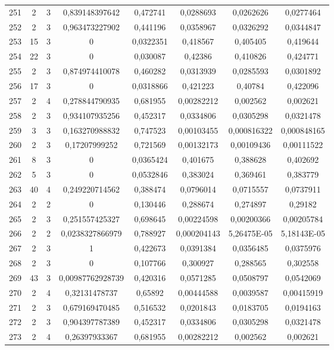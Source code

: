 \begin{longtable}{|c|c|c|c|c|c|c|c|}
251 & 2 & 3 & 0,839148397642 & 0,472741 & 0,0288693 & 0,0262626 & 0,0277464  \\
252 & 2 & 3 & 0,963473227902 & 0,441196 & 0,0358967 & 0,0326292 & 0,0344847  \\
253 & 15 & 3 & 0 & 0,0322351 & 0,418567 & 0,405405 & 0,419644  \\
254 & 22 & 3 & 0 & 0,030087 & 0,42386 & 0,410826 & 0,424771  \\
255 & 2 & 3 & 0,874974410078 & 0,460282 & 0,0313939 & 0,0285593 & 0,0301892  \\
256 & 17 & 3 & 0 & 0,0318866 & 0,421223 & 0,40784 & 0,422096  \\
257 & 2 & 4 & 0,278844790935 & 0,681955 & 0,00282212 & 0,002562 & 0,002621  \\
258 & 2 & 3 & 0,934107935256 & 0,452317 & 0,0334806 & 0,0305298 & 0,0321478  \\
259 & 3 & 3 & 0,163270988832 & 0,747523 & 0,00103455 & 0,000816322 & 0,000848165  \\
260 & 2 & 3 & 0,17207999252 & 0,721569 & 0,00132173 & 0,00109436 & 0,00111522  \\
261 & 8 & 3 & 0 & 0,0365424 & 0,401675 & 0,388628 & 0,402692  \\
262 & 5 & 3 & 0 & 0,0532846 & 0,383024 & 0,369461 & 0,383779  \\
263 & 40 & 4 & 0,249220714562 & 0,388474 & 0,0796014 & 0,0715557 & 0,0737911  \\
264 & 2 & 2 & 0 & 0,130446 & 0,288674 & 0,274897 & 0,29182  \\
265 & 2 & 3 & 0,251557425327 & 0,698645 & 0,00224598 & 0,00200366 & 0,00205784  \\
266 & 2 & 2 & 0,0238327866979 & 0,788927 & 0,000204143 & 5,26475E-05 & 5,18143E-05  \\
267 & 2 & 3 & 1 & 0,422673 & 0,0391384 & 0,0356485 & 0,0375976  \\
268 & 2 & 3 & 0 & 0,107766 & 0,300927 & 0,288565 & 0,302558  \\
269 & 43 & 3 & 0,00987762928739 & 0,420316 & 0,0571285 & 0,0508797 & 0,0542069  \\
270 & 2 & 4 & 0,32131478737 & 0,65892 & 0,00444588 & 0,0039587 & 0,00415919  \\
271 & 2 & 3 & 0,679169470485 & 0,516532 & 0,0201843 & 0,0183705 & 0,0194163  \\
272 & 2 & 3 & 0,904397787389 & 0,452317 & 0,0334806 & 0,0305298 & 0,0321478  \\
273 & 2 & 4 & 0,26397933367 & 0,681955 & 0,00282212 & 0,002562 & 0,002621  \\

\end{longtable}
